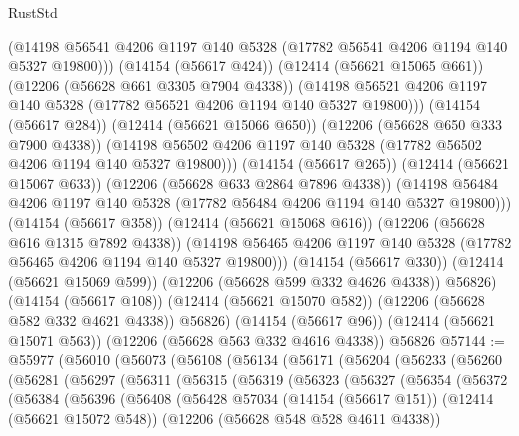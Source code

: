 \begin{lexlean}{RustStd}
\begin{coremodule}
                  (@14198
                    @56541
                    @4206
                    @1197
                    @140
                    @5328
                    (@17782 @56541 @4206 @1194 @140 @5327 @19800)))
                (@14154 (@56617 @424))
                (@12414 (@56621 @15065 @661))
                (@12206 (@56628 @661 @3305 @7904 @4338))
                (@14198
                  @56521
                  @4206
                  @1197
                  @140
                  @5328
                  (@17782 @56521 @4206 @1194 @140 @5327 @19800)))
              (@14154 (@56617 @284))
              (@12414 (@56621 @15066 @650))
              (@12206 (@56628 @650 @333 @7900 @4338))
              (@14198 @56502 @4206 @1197 @140 @5328 (@17782 @56502 @4206 @1194 @140 @5327 @19800)))
            (@14154 (@56617 @265))
            (@12414 (@56621 @15067 @633))
            (@12206 (@56628 @633 @2864 @7896 @4338))
            (@14198 @56484 @4206 @1197 @140 @5328 (@17782 @56484 @4206 @1194 @140 @5327 @19800)))
          (@14154 (@56617 @358))
          (@12414 (@56621 @15068 @616))
          (@12206 (@56628 @616 @1315 @7892 @4338))
          (@14198 @56465 @4206 @1197 @140 @5328 (@17782 @56465 @4206 @1194 @140 @5327 @19800)))
        (@14154 (@56617 @330))
        (@12414 (@56621 @15069 @599))
        (@12206 (@56628 @599 @332 @4626 @4338))
        @56826)
      (@14154 (@56617 @108))
      (@12414 (@56621 @15070 @582))
      (@12206 (@56628 @582 @332 @4621 @4338))
      @56826)
    (@14154 (@56617 @96))
    (@12414 (@56621 @15071 @563))
    (@12206 (@56628 @563 @332 @4616 @4338))
    @56826
@57144 := @55977
    (@56010
      (@56073
        (@56108
          (@56134
            (@56171
              (@56204
                (@56233
                  (@56260
                    (@56281
                      (@56297
                        (@56311
                          (@56315
                            (@56319
                              (@56323
                                (@56327
                                  (@56354
                                    (@56372
                                      (@56384
                                        (@56396
                                          (@56408
                                            (@56428
                                              @57034
                                              (@14154 (@56617 @151))
                                              (@12414 (@56621 @15072 @548))
                                              (@12206 (@56628 @548 @528 @4611 @4338))

\end{coremodule}
\end{lexlean}
